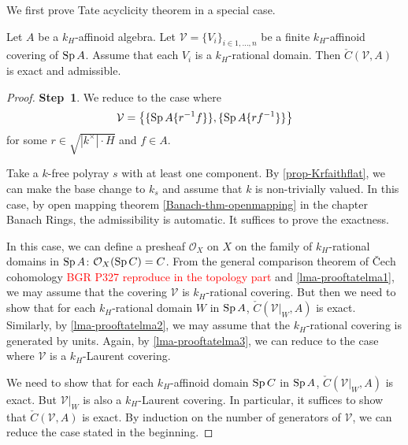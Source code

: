 We first prove Tate acyclicity theorem in a special case.
\begin{lemma}\label{lma-tateacyc1}
    Let $A$ be a $k_H$-affinoid algebra. Let $\mathcal{V}=\{V_i\}_{i\in 1,\ldots,n}$ be a finite $k_H$-affinoid covering of $\operatorname{Sp} A$. Assume that each $V_i$ is a $k_H$-rational domain. Then $\check{C}(\mathcal{V},A)$ is exact and admissible.
\end{lemma}
\begin{proof}
    \textbf{Step~1}. We reduce to the case where
    \[
        \mathcal{V}=\left\{\{\operatorname{Sp} A\{r^{-1}f\}\},\{\operatorname{Sp} A\{rf^{-1}\}\}\right\}
    \]
    for some $r\in \sqrt{|k^{\times}|\cdot H}$ and $f\in A$.


    Take a $k$-free polyray $s$ with at least one component. By \cref{prop-Krfaithflat}, we can make the base change to $k_s$ and assume that $k$ is non-trivially valued. In this case, by open mapping theorem \cref{Banach-thm-openmapping} in the chapter Banach Rings, the admissibility is automatic. It suffices to prove the exactness.

    In this case, we can define a presheaf $\mathcal{O}_X$ on $X$ on the family of $k_H$-rational domains in $\operatorname{Sp} A$:  $\mathcal{O}_X(\operatorname{Sp} C)=C$. From the general comparison theorem of \v{C}ech cohomology \textcolor{red}{BGR P327 reproduce in the topology part} and \cref{lma-prooftatelma1}, we may assume that the covering $\mathcal{V}$ is  $k_H$-rational covering. But then we need to show that for each $k_H$-rational domain $W$ in $\operatorname{Sp} A$, $\check{C}(\mathcal{V}|_W,A)$ is exact. Similarly, by \cref{lma-prooftatelma2}, we may assume that the $k_H$-rational covering is generated by units. Again, by \cref{lma-prooftatelma3}, we can reduce to the case where $\mathcal{V}$ is a $k_H$-Laurent covering.

    We need to show that for each $k_H$-affinoid domain $\operatorname{Sp} C$ in $\operatorname{Sp} A$, $\check{C}(\mathcal{V}|_W,A)$ is exact. But $\mathcal{V}|_W$ is also a $k_H$-Laurent covering. In particular, it suffices to show that $\check{C}(\mathcal{V},A)$ is exact. By induction on the number of generators of $\mathcal{V}$, we can reduce the case stated in the beginning.
    

\end{proof}

